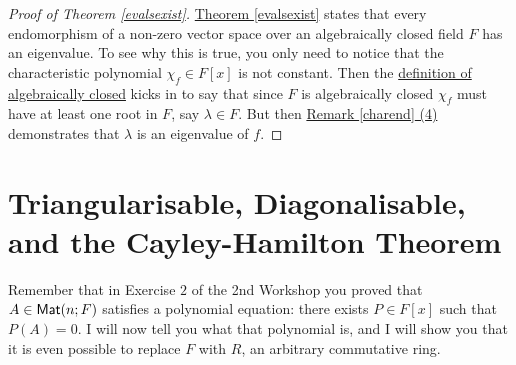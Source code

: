\documentclass[11pt]{amsbook}
\theoremstyle{definition}
\begin{document}
\begin{proof}[Proof of Theorem \ref{evalsexist}]
\hyperref[evalsexist]{Theorem \ref{evalsexist}} states that every endomorphism of a non-zero vector space over an algebraically closed field $F$ has an eigenvalue. To see why this is true, you only need to notice that the characteristic polynomial $\chi_f \in F[x]$ is not constant. Then the \hyperref[algclsdef]{definition of algebraically closed} kicks in to say that since $F$ is algebraically closed $\chi_f$ must have at least one root in $F$, say $\lambda\in F$. But then \hyperref[charend]{Remark \ref{charend} (4)} demonstrates that $\lambda$ is an eigenvalue of $f$.
\end{proof}

\section{Triangularisable, Diagonalisable, and the Cayley-Hamilton Theorem}
Remember that in Exercise $2$ of the 2nd Workshop you proved that $A\in {\sf Mat}(n;F)$ satisfies a polynomial equation: there exists $P\in F[x]$ such that $P(A) = 0$. I will now tell you what that polynomial is, and I will show you that it is even possible to replace $F$ with $R$, an arbitrary commutative ring.
\end{document}
